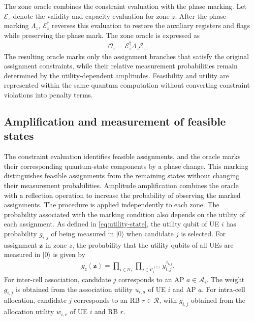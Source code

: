 \documentclass[journal]{IEEEtran}
\newcommand{\ket}[1]{\lvert #1 \rangle}
\begin{document}
{{The zone oracle combines the constraint evaluation with the phase marking. Let $\mathcal{E}_z$ denote the validity and capacity evaluation for zone $z$. After the phase marking $\Lambda_z$, $\mathcal{E}_z^{\dagger}$ reverses this evaluation to restore the auxiliary registers and flags while preserving the phase mark. The zone oracle is expressed as
\begin{align}
\mathcal{O}_z
=\mathcal{E}_z^{\dagger}
\Lambda_z
\mathcal{E}_z.
\label{eq:op-oracle}
\end{align}
The resulting oracle marks only the assignment branches that satisfy the original assignment constraints, while their relative measurement probabilities remain determined by the utility-dependent amplitudes.
Feasibility and utility are represented within the same quantum computation without converting constraint violations into penalty terms.

\vspace{-3mm}
\subsection{Amplification and measurement of feasible states}
\label{sec:distribution}

The constraint evaluation identifies feasible assignments, and the oracle marks their corresponding quantum-state components by a phase
change. This marking distinguishes feasible assignments from the remaining states without changing their measurement probabilities.
Amplitude amplification combines the oracle with a reflection operation to increase the probability of observing the marked assignments. The
procedure is applied independently to each zone. The probability associated with the marking condition also depends on
the utility of each assignment. As defined in \eqref{eq:utility-state}, the utility qubit of UE $i$ has probability $g_{i,j}$ of being measured in $\ket{0}$ when candidate $j$ is selected. For assignment $\bm z$ in zone $z$, the probability that the utility qubits of all UEs are measured in $\ket{0}$ is given by
\begin{align}
g_z(\bm z)=\prod_{i\in\mathcal{U}_z}\prod_{j\in\mathcal{C}_i^{(z)}}g_{i,j}^{z_{i,j}}.
\label{eq:zone-utility-weight}
\end{align}
For inter-cell association, candidate $j$ corresponds to an AP $a\in\mathcal{A}_i$. The weight $g_{i,j}$ is obtained from the
association utility $u_{i,a}$ of UE $i$ and AP $a$. For intra-cell allocation, candidate $j$ corresponds to an RB $r\in\mathcal{R}$,
with $g_{i,j}$ obtained from the allocation utility $w_{i,r}$ of UE $i$ and RB $r$.

}}
\end{document}
